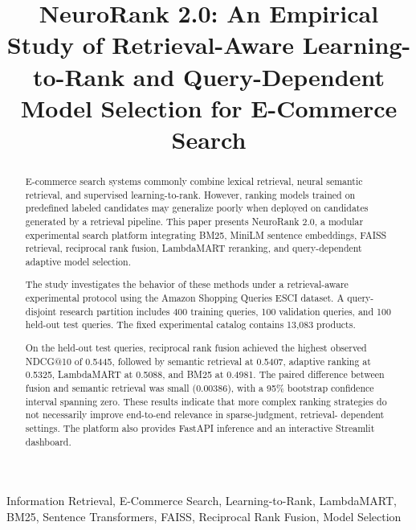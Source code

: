 \documentclass[conference]{IEEEtran}
\begin{document}
\title{NeuroRank 2.0: An Empirical Study of
Retrieval-Aware Learning-to-Rank and
Query-Dependent Model Selection for
E-Commerce Search}

\author{
}

\maketitle

\begin{abstract}
E-commerce search systems commonly combine
lexical retrieval, neural semantic retrieval,
and supervised learning-to-rank. However,
ranking models trained on predefined labeled
candidates may generalize poorly when deployed
on candidates generated by a retrieval pipeline.
This paper presents NeuroRank 2.0, a modular
experimental search platform integrating BM25,
MiniLM sentence embeddings, FAISS retrieval,
reciprocal rank fusion, LambdaMART reranking,
and query-dependent adaptive model selection.

The study investigates the behavior of these
methods under a retrieval-aware experimental
protocol using the Amazon Shopping Queries
ESCI dataset. A query-disjoint research
partition includes 400 training queries,
100 validation queries, and 100 held-out
test queries. The fixed experimental catalog
contains 13,083 products.

On the held-out test queries, reciprocal rank
fusion achieved the highest observed
NDCG@10 of 0.5445, followed by semantic
retrieval at 0.5407, adaptive ranking at
0.5325, LambdaMART at 0.5088, and BM25
at 0.4981. The paired difference between
fusion and semantic retrieval was small
(0.00386), with a 95\% bootstrap confidence
interval spanning zero. These results
indicate that more complex ranking strategies
do not necessarily improve end-to-end
relevance in sparse-judgment, retrieval-
dependent settings. The platform also
provides FastAPI inference and an
interactive Streamlit dashboard.
\end{abstract}

\begin{IEEEkeywords}
Information Retrieval, E-Commerce Search,
Learning-to-Rank, LambdaMART, BM25,
Sentence Transformers, FAISS,
Reciprocal Rank Fusion, Model Selection
\end{IEEEkeywords}
\end{document}
